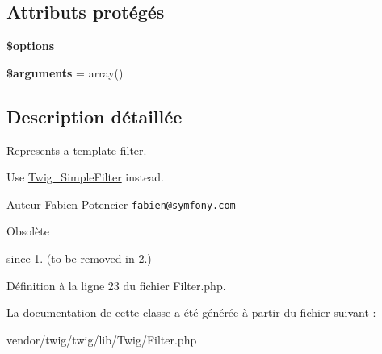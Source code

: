 \subsection*{Attributs protégés}
\begin{DoxyCompactItemize}
\item 
{\bfseries \$options}\hypertarget{class_twig___filter_a011800c63ece4cbbfa77136a20607023}{}\label{class_twig___filter_a011800c63ece4cbbfa77136a20607023}

\item 
{\bfseries \$arguments} = array()\hypertarget{class_twig___filter_a61eded163d962fc248b3cf209000979b}{}\label{class_twig___filter_a61eded163d962fc248b3cf209000979b}

\end{DoxyCompactItemize}


\subsection{Description détaillée}
Represents a template filter.

Use \hyperlink{class_twig___simple_filter}{Twig\+\_\+\+Simple\+Filter} instead.

\begin{DoxyAuthor}{Auteur}
Fabien Potencier \href{mailto:fabien@symfony.com}{\tt fabien@symfony.\+com}
\end{DoxyAuthor}
\begin{DoxyRefDesc}{Obsolète}
\item[\hyperlink{deprecated__deprecated000020}{Obsolète}]since 1. (to be removed in 2.) \end{DoxyRefDesc}


Définition à la ligne 23 du fichier Filter.\+php.



La documentation de cette classe a été générée à partir du fichier suivant \+:\begin{DoxyCompactItemize}
\item 
vendor/twig/twig/lib/\+Twig/Filter.\+php\end{DoxyCompactItemize}
